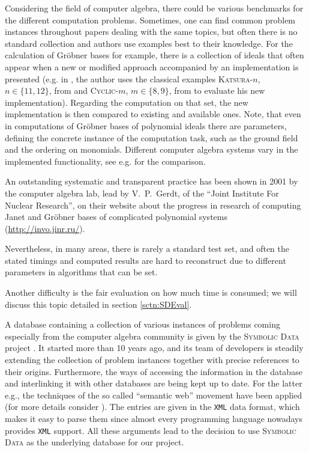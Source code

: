 \documentclass[oribibl,11pt]{article}
\begin{document}
Considering the field of computer algebra, there could be various
benchmarks for the different computation problems. Sometimes, one can
find common problem instances throughout papers dealing with the same
topics, but often there is no standard collection and authors use
examples best to their knowledge. For the calculation of Gr\"obner
bases for example, there is a collection of ideals that often appear
when a new or modified approach accompanied by an implementation is
presented (e.g. in \cite{sneumann2012Parallel}, the author uses the
classical examples
\textsc{Katsura}-$n$, $n \in \{11,12\}$, from
\cite{katsura1987distribution} and \textsc{Cyclic}-$m$, $m \in
\{8,9\}$, from \cite{bjorck2008all} to evaluate his new implementation). Regarding the computation on that
set, the new implementation is then compared to existing and available
ones. Note, that even in computations of Gr\"obner bases of polynomial 
ideals there are parameters, defining the concrete instance of the computation task, such as the ground field and the ordering on monomials. Different
computer algebra systems vary in the implemented functionality, see 
e.g. \cite{GBImpl} for the comparison.  


An outstanding systematic and transparent practice has been shown in 2001 by the computer algebra
lab, lead by V.~P.~Gerdt, of the ``Joint Institute For Nuclear
Research'', on their website about the progress in research of
computing Janet and Gr\"obner bases of complicated polynomial systems
(\url{http://invo.jinr.ru/}).

Nevertheless, in many areas, there is rarely a standard test set, and
often the stated timings and computed results are hard to reconstruct due to different
parameters in algorithms that can be set.

Another difficulty is the fair evaluation on how much time is
consumed; we will discuss this topic detailed in section
\ref{sctn:SDEval}.

A database containing a collection of various instances of problems
coming especially from the computer algebra community is given by the
\textsc{Symbolic Data} project \cite{grabe2006symbolicdata}. It
started more than 10 years ago, and its team of developers is steadily
extending the collection of problem instances together with precise
references to their origins. Furthermore, the ways of accessing the
information in the
database and interlinking it with other databases are being kept up to
date. For the latter e.g., the techniques of the
so called ``semantic web'' movement have been applied (for
more details consider \cite{grabe2013symbolicdata}). The entries are
given in the \texttt{XML} data format, which makes it easy to parse
them since almost every programming language nowadays provides \texttt{XML}
support. All these arguments lead to the decision to use \textsc{Symbolic Data} as the underlying
database for our project.
\end{document}
